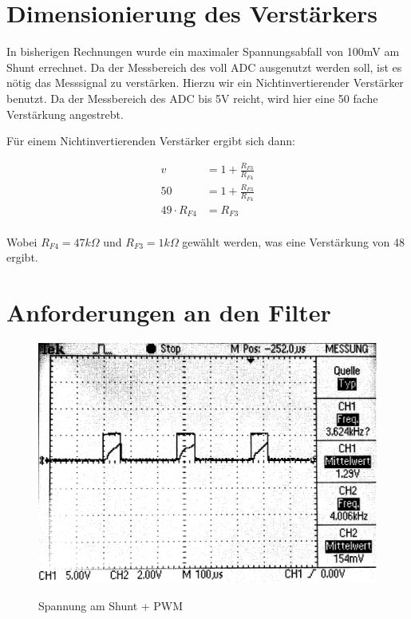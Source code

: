 \section{Dimensionierung des Verstärkers}

In bisherigen Rechnungen wurde ein maximaler Spannungsabfall von 100mV am Shunt errechnet. Da der Messbereich des voll ADC ausgenutzt werden soll,
ist es nötig das Messsignal zu verstärken. Hierzu wir ein Nichtinvertierender Verstärker benutzt. Da der Messbereich des ADC bis 5V reicht, wird hier eine 
50 fache Verstärkung angestrebt.

Für einem Nichtinvertierenden Verstärker ergibt sich dann:

\begin{align*}
v &= 1 + \frac{R_{F3}}{R_{F4}}\\
50 &= 1 + \frac{R_{F3}}{R_{F4}}\\
49\cdot R_{F4} &= R_{F3}
\end{align*}
\\
Wobei $R_{F4} = 47 k\Omega$ und $R_{F3} = 1 k\Omega$  gewählt werden, was eine Verstärkung von 48 ergibt.



\section{Anforderungen an den Filter}

\begin{figure}[H]
\centering
\includegraphics[width=.8\textwidth]{oszi.png}\\
\caption{Spannung am Shunt + PWM}%
\label{fig:pwm+i}
\end{figure}

